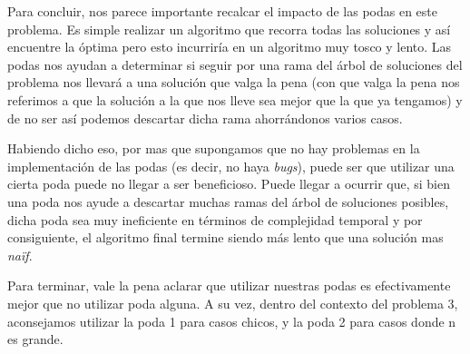 Para concluir, nos parece importante recalcar el impacto de las podas en este problema. Es simple realizar un algoritmo que recorra todas las soluciones y así encuentre la óptima pero esto incurriría en un algoritmo muy tosco y lento. Las podas nos ayudan a determinar si seguir por una rama del árbol de soluciones del problema nos llevará a una solución que valga la pena (con que valga la pena nos referimos a que la solución a la que nos lleve sea mejor que la que ya tengamos) y de no ser así podemos descartar dicha rama ahorrándonos varios casos.

Habiendo dicho eso, por mas que supongamos que no hay problemas en la implementación de las podas (es decir, no haya \emph{bugs}), puede ser que utilizar una cierta poda puede no llegar a ser beneficioso. Puede llegar a ocurrir que, si bien una poda nos ayude a descartar muchas ramas del árbol de soluciones posibles, dicha poda sea muy ineficiente en términos de complejidad temporal y por consiguiente, el algoritmo final termine siendo más lento que una solución mas \emph{naïf}.

Para terminar, vale la pena aclarar que utilizar nuestras podas es efectivamente mejor que no utilizar poda alguna. A su vez, dentro del contexto del problema 3, aconsejamos utilizar la poda 1 para casos chicos, y la poda 2 para casos donde n es grande.